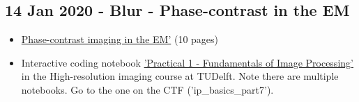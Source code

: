 \documentclass[11pt, oneside]{article}   	%
\begin{document}
\subsection{14 Jan 2020 - Blur - Phase-contrast in the EM}
\begin{itemize}
	\item \href{https://cryoemprinciples.yale.edu/sites/default/files/files/2%20Phase%20contrast.pdf}{Phase-contrast imaging in the EM'} (10 pages)
	\item Interactive coding notebook \href{https://gitlab.tudelft.nl/aj-lab/teaching/-/wikis/NB4020}{'Practical 1 - Fundamentals of Image Processing'} in the High-resolution imaging course at TUDelft. Note there are multiple notebooks. Go to the one on the CTF ('ip\_basics\_part7').
\end{itemize}
\end{document}
